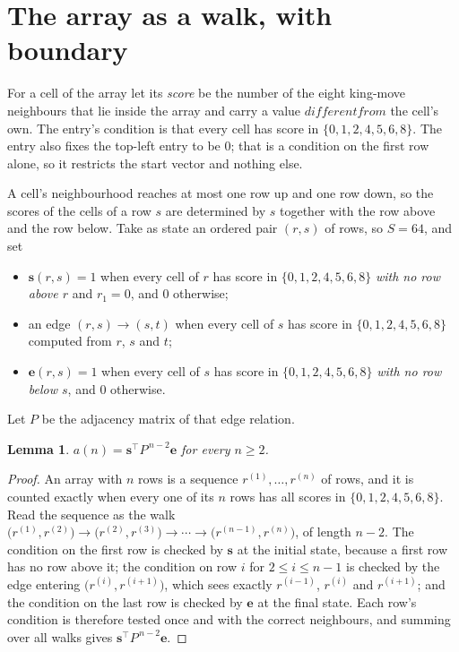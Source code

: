 \documentclass[11pt,a4paper]{article}
\theoremstyle{plain}
\newtheorem{lemma}[theorem]{Lemma}
\theoremstyle{definition}
\begin{document}
\section{The array as a walk, with boundary}

For a cell of the array let its \emph{score} be the number of the eight king-move neighbours that lie inside
the array and carry a value $different from$ the cell's own. The entry's condition is that every cell
has score in $\{0,1,2,4,5,6,8\}$. The entry also fixes the top-left entry to be $0$; that is a condition on the first row alone, so it restricts the start vector and nothing else.

A cell's neighbourhood reaches at most one row up and one row down, so the scores of the
cells of a row $s$ are determined by $s$ together with the row above and the row below.
Take as state an ordered pair $(r,s)$ of rows, so $S=64$, and set
\begin{itemize}
\item $\mathbf{s}(r,s)=1$ when every cell of $r$ has score in $\{0,1,2,4,5,6,8\}$ \emph{with no row
above $r$} and $r_1=0$, and $0$ otherwise;
\item an edge $(r,s)\to(s,t)$ when every cell of $s$ has score in $\{0,1,2,4,5,6,8\}$ computed from
$r$, $s$ and $t$;
\item $\mathbf{e}(r,s)=1$ when every cell of $s$ has score in $\{0,1,2,4,5,6,8\}$ \emph{with no row
below $s$}, and $0$ otherwise.
\end{itemize}
Let $P$ be the adjacency matrix of that edge relation.

\begin{lemma}\label{lem:walk}
$a(n)=\mathbf{s}^{\!\top}P^{\,n-2}\mathbf{e}$ for every $n\ge2$.
\end{lemma}

\begin{proof}
An array with $n$ rows is a sequence $r^{(1)},\dots,r^{(n)}$ of rows, and it is counted
exactly when every one of its $n$ rows has all scores in $\{0,1,2,4,5,6,8\}$. Read the sequence as the
walk $\bigl(r^{(1)},r^{(2)}\bigr)\to\bigl(r^{(2)},r^{(3)}\bigr)\to\cdots\to
\bigl(r^{(n-1)},r^{(n)}\bigr)$, of length $n-2$. The condition on the first row is
checked by $\mathbf{s}$ at the initial state, because a first row has no row above it; the
condition on row $i$ for $2\le i\le n-1$ is checked by the edge entering
$\bigl(r^{(i)},r^{(i+1)}\bigr)$, which sees exactly $r^{(i-1)}$, $r^{(i)}$ and
$r^{(i+1)}$; and the condition on the last row is checked by $\mathbf{e}$ at the final
state. Each row's condition is therefore tested once and with the correct neighbours, and
summing over all walks gives $\mathbf{s}^{\!\top}P^{\,n-2}\mathbf{e}$.
\end{proof}
\end{document}
